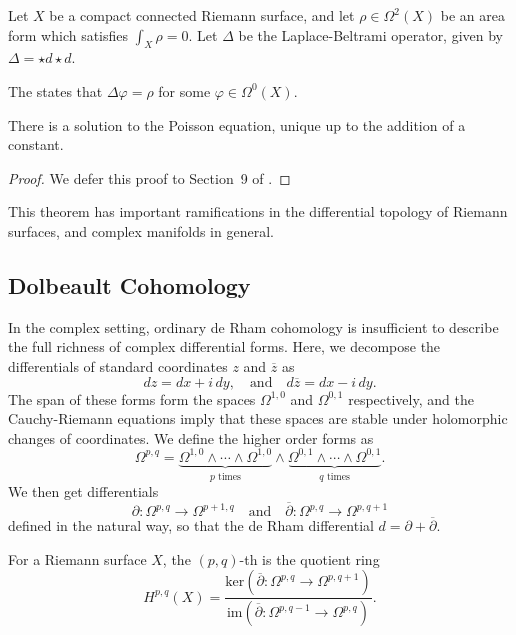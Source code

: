 \documentclass{lkx_paper}
\begin{document}
Let $X$ be a compact connected Riemann surface, and let $\rho\in \Omega^2(X)$ be an area form which satisfies $\int_X \rho = 0$. Let $\Delta$ be the Laplace-Beltrami operator, given by $\Delta = \star d\star d$.

\begin{definition}
	The  states that $\Delta \varphi = \rho$ for some $\varphi\in \Omega^0(X)$.
\end{definition}

\begin{theorem}
	There is a solution to the Poisson equation, unique up to the addition of a constant.
\end{theorem}
\begin{proof}
	We defer this proof to Section~9 of \cite{donaldson}.
\end{proof}

This theorem has important ramifications in the differential topology of Riemann surfaces, and complex manifolds in general.

\subsection{Dolbeault Cohomology}

In the complex setting, ordinary de Rham cohomology is insufficient to describe the full richness of complex differential forms. Here, we decompose the differentials of standard coordinates $z$ and $\overline{z}$ as
\[
	dz = dx + i\,dy,\quad\textrm{and}\quad d\overline{z} = dx - i\,dy.
\]
The span of these forms form the spaces $\Omega^{1,0}$ and $\Omega^{0,1}$ respectively, and the Cauchy-Riemann equations imply that these spaces are stable under holomorphic changes of coordinates. We define the higher order forms as
\[
	\Omega^{p,q} =
	\underbrace{\Omega^{1,0}\wedge \cdots \wedge \Omega^{1,0}}_{p\textrm{ times}}\wedge
	\underbrace{\Omega^{0,1}\wedge \cdots \wedge \Omega^{0,1}}_{q\textrm{ times}}.
\]
We then get differentials
\[
	\partial : \Omega^{p,q} \to \Omega^{p+1, q}\quad\textrm{and}\quad \overline{\partial} : \Omega^{p,q} \to \Omega^{p,q+1}
\]
defined in the natural way, so that the de Rham differential $d=\partial+\overline{\partial}$.

\begin{definition}
	For a Riemann surface $X$, the $(p,q)$-th  is the quotient ring
	\[
		H^{p,q}(X) = \frac{\textrm{ker}(\overline{\partial} : \Omega^{p,q} \to \Omega^{p,q+1})}{\textrm{im}(\overline{\partial} : \Omega^{p,q-1} \to \Omega^{p,q})}.
	\]
\end{definition}
\end{document}
